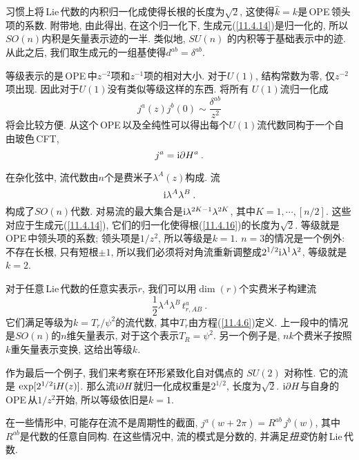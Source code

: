 习惯上将\,Lie\,代数的内积归一化成使得长根的长度为$ \sqrt{2}$, 这使得$ \hat{k}=k $是\,OPE\,领头项的系数. 附带地, 由此得出, 在这个归一化下, 生成元(\ref{11.4.14})是归一化的, 所以$ SO(n) $内积是矢量表示迹的一半. 类似地, $SU(n)$ 的内积等于基础表示中的迹. 从此之后, 我们取生成元的一组基使得$ d^{ab}=\delta^{ab}$.


等级表示的是\,OPE\,中$ z^{-2} $项和$ z^{-1} $项的相对大小. 对于$ U(1)$, 结构常数为零, 仅$ z^{-2}$项出现. 因此对于$ U(1) $没有类似等级这样的东西. 将所有 $U(1) $流归一化成
\begin{equation}
    j^{a}(z)j^{b}(0) \sim \frac{\delta^{ab}}{z^{2}} \label{11.5.14}
\end{equation}
将会比较方便. 从这个\,OPE\,以及全纯性可以得出每个$ U(1) $流代数同构于一个自由玻色\,CFT,
\begin{equation}
    j^{a}=\mathrm{i}\partial H^{a} \:. \label{11.5.15}
\end{equation}

在杂化弦中, 流代数由$ n $个是费米子$ \lambda^{A}(z) $构成. 流
\begin{equation}
\mathrm{i}\lambda^{A}\lambda^{B} \:. \label{11.5.16}
\end{equation}
构成了$ SO(n) $代数. 对易流的最大集合是$ \mathrm{i}\lambda^{2K-1}\lambda^{2K}$, 其中$ K=1,\cdots,[n/2]$. 这些对应于生成元(\ref{11.4.14}), 它们的归一化使得根(\ref{11.4.16})的长度为$ \sqrt{2}$. 等级就是\,OPE\,中领头项的系数; 领头项是$ 1/z^{2}$, 所以等级是$ k=1$. $n=3 $的情况是一个例外: 不存在长根, 只有短根$ \pm1$, 所以我们必须将对角流重新调整成$ 2^{1/2}\mathrm{i}\lambda^{1}\lambda^{2}$, 等级就是$ k=2$.

对于任意\,Lie\,代数的任意实表示$ r$, 我们可以用$ \operatorname{dim}(r) $个实费米子构建流
\begin{equation}
    \frac{1}{2}\lambda^{A}\lambda^{B}\,t_{r,AB}^{a} \:. \label{11.5.17}
\end{equation}
它们满足等级为$ k=T_{r}/\psi^{2} $的流代数, 其中$ T_{r} $由方程(\ref{11.4.6})定义. 上一段中的情况是$ SO(n) $的$ n $维矢量表示, 对于这个表示$ T_{R}=\psi^{2}$. 另一个例子是, $nk $个费米子按照$ k $重矢量表示变换, 这给出等级$ k$.

作为最后一个例子, 我们来考察在环形紧致化自对偶点的 $SU(2) $ 对称性. 它的流是 $ \exp[2^{1/2}\mathrm{i} H(z)]$. 那么流$ \mathrm{i}\partial H $就归一化成权重是$ 2^{1/2}$, 长度为$ \sqrt{2}$. $\mathrm{i}\partial H $与自身的\,OPE\,从$ 1/z^{2} $开始, 所以等级依旧是$ k=1$.

在一些情形中, 可能存在流不是周期性的截面, $j^{a}(w+2\pi)=R^{ab}\,j^{b}(w)$, 其中$ R^{ab} $是代数的任意自同构. 在这些情况中, 流的模式是分数的, 并满足{\emph{扭变}}仿射\,Lie\,代数.

